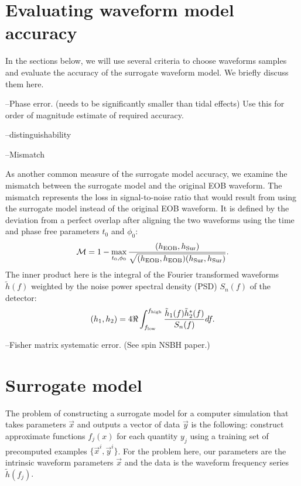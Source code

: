 \documentclass[prd,aps,letter,twocolumn,floatfix,notitlepage]{revtex4-1}
\begin{document}
\section{Evaluating waveform model accuracy}

In the sections below, we will use several criteria to choose waveforms samples and evaluate the accuracy of the 
surrogate waveform model. We briefly discuss them here.

--Phase error. (needs to be significantly smaller than tidal effects) Use this for order of magnitude estimate of required
accuracy.

--distinguishability

--Mismatch

As another common measure of the surrogate model accuracy, we examine the mismatch between 
the surrogate model and the original EOB waveform.
The mismatch represents the loss in signal-to-noise ratio that would result 
from using the surrogate model instead of the original EOB waveform. 
It is defined by the deviation from a perfect overlap after aligning the two waveforms
using the time and phase free parameters $t_0$ and $\phi_0$:
\begin{equation}
\mathcal{M} = 1 - \max_{t_0, \phi_0} \frac{(h_{\rm EOB}, h_{\rm Sur})} {\sqrt{(h_{\rm EOB}, h_{\rm EOB}) (h_{\rm Sur}, h_{\rm Sur})}}.
\end{equation}
The inner product here  is the integral of the Fourier transformed waveforms $\tilde h(f)$ weighted by the noise power spectral 
density (PSD) $S_n(f)$ of the detector:
\begin{equation}
(h_1, h_2) = 4 \Re \int_{f_{\rm low}}^{f_{\rm high}} \frac{\tilde h_1(f) \tilde h^*_2(f)} {S_n(f)} df.
\end{equation}

--Fisher matrix systematic error. (See spin NSBH paper.)

\section{Surrogate model}

The problem of constructing a surrogate model for a computer simulation that takes parameters 
$\vec x$ and outputs a vector of data $\vec y$ is the following: construct approximate functions $f_j(x)$
for each quantity $y_j$ using a training set of precomputed examples $\{\vec x^i, \vec y^i\}$. For the problem here, 
our parameters are the intrinsic waveform parameters $\vec x$ and the data is the waveform frequency series $\tilde h(f_j)$. 
\end{document}
